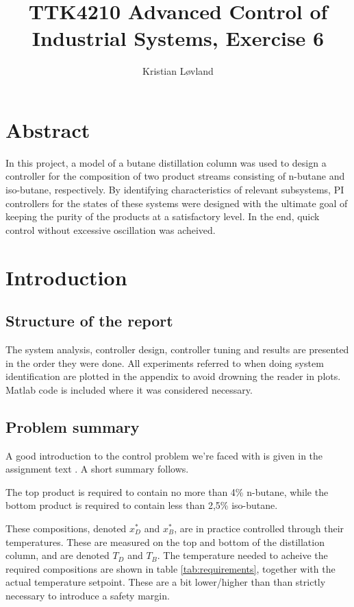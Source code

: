 \documentclass[12pt]{article}
\title{TTK4210 Advanced Control of Industrial Systems, Exercise 6}
\date{}
\author{Kristian Løvland}
\begin{document}
\maketitle
\newpage
\tableofcontents

\newpage
\section{Abstract}
In this project, a model of a butane distillation column was used to design a controller for the composition of two product streams consisting of n-butane and iso-butane, respectively. By identifying characteristics of relevant subsystems, PI controllers for the states of these systems were designed with the ultimate goal of keeping the purity of the products at a satisfactory level. In the end, quick control without excessive oscillation was acheived.

\newpage
\section{Introduction}

\subsection{Structure of the report}
The system analysis, controller design, controller tuning and results are presented in the order they were done. All experiments referred to when doing system identification are plotted in the appendix to avoid drowning the reader in plots. Matlab code is included where it was considered necessary.

\subsection{Problem summary}
A good introduction to the control problem we're faced with is given in the assignment text \cite{oppgavetekst}. A short summary follows.

The top product is required to contain no more than 4\% n-butane, while the bottom product is required to contain less than 2,5\% iso-butane. 

These compositions, denoted $x_D^*$ and $x_B^*$, are in practice controlled through their temperatures. These are measured on the top and bottom of the distillation column, and are denoted $T_D$ and $T_B$. The temperature needed to acheive the required compositions are shown in table \ref{tab:requirements}, together with the actual temperature setpoint. These are a bit lower/higher than than strictly necessary to introduce a safety margin.
\end{document}
